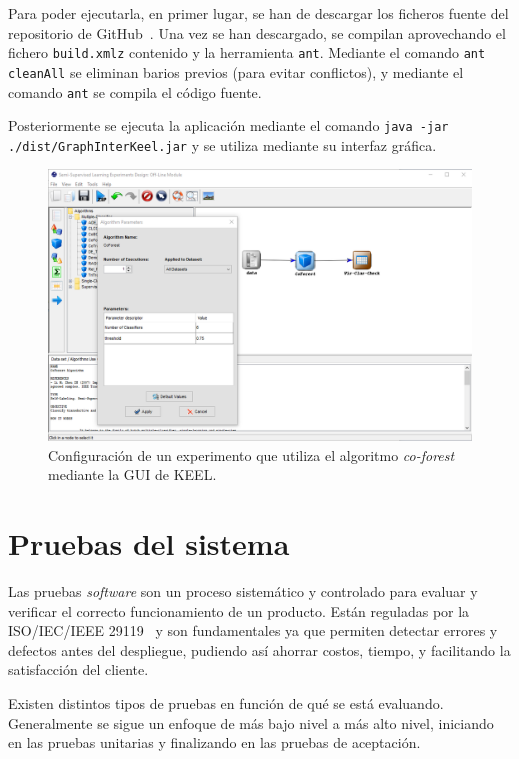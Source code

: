 Para poder ejecutarla, en primer lugar, se han de descargar los ficheros fuente del repositorio de GitHub~\cite{keelRepo}. Una vez se han descargado, se compilan aprovechando el fichero \texttt{build.xmlz} contenido y la herramienta \texttt{ant}. Mediante el comando \texttt{ant cleanAll} se eliminan barios previos (para evitar conflictos), y mediante el comando \texttt{ant} se compila el código fuente.

Posteriormente se ejecuta la aplicación mediante el comando \texttt{java -jar ./dist/GraphInterKeel.jar} y se utiliza mediante su interfaz gráfica.

\begin{figure}[h]
	\caption[\textit{Co-forest}: Configuración de un experimento en KEEL]{Configuración de un experimento que utiliza el algoritmo \textit{co-forest} mediante la GUI de KEEL.}
	\centering
	\includegraphics[width=\textwidth]{../img/anexos/manual/keel_gui.png}
\end{figure}


\section{Pruebas del sistema}
\label{s:pruebas}

Las pruebas \textit{software} son un proceso sistemático y controlado para evaluar y verificar el correcto funcionamiento de un producto. Están reguladas por la ISO/IEC/IEEE 29119~\cite{iso-pruebas} y son fundamentales ya que permiten detectar errores y defectos antes del despliegue, pudiendo así ahorrar costos, tiempo, y facilitando la satisfacción del cliente.

Existen distintos tipos de pruebas en función de qué se está evaluando. Generalmente se sigue un enfoque de más bajo nivel a más alto nivel, iniciando en las pruebas unitarias y finalizando en las pruebas de aceptación.



